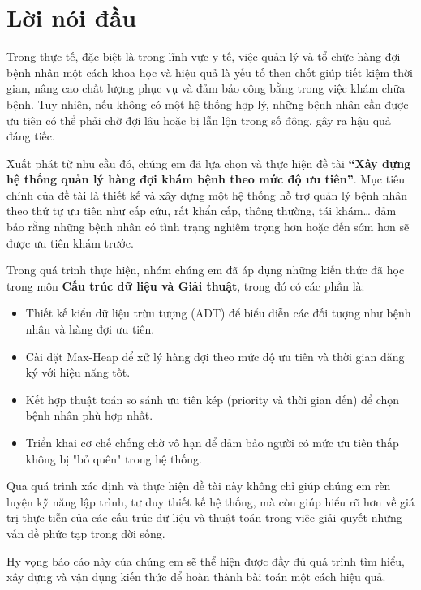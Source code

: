\section*{Lời nói đầu}
\thispagestyle{empty}
Trong thực tế, đặc biệt là trong lĩnh vực y tế, việc quản lý và tổ chức hàng đợi bệnh nhân một cách khoa học và hiệu quả là yếu tố then chốt giúp tiết kiệm thời gian, nâng cao chất lượng phục vụ và đảm bảo công bằng trong việc khám chữa bệnh. Tuy nhiên, nếu không có một hệ thống hợp lý, những bệnh nhân cần được ưu tiên có thể phải chờ đợi lâu hoặc bị lẫn lộn trong số đông, gây ra hậu quả đáng tiếc.

Xuất phát từ nhu cầu đó, chúng em đã lựa chọn và thực hiện đề tài \textbf{ “Xây dựng hệ thống quản lý hàng đợi khám bệnh theo mức độ ưu tiên”}. Mục tiêu chính của đề tài là thiết kế và xây dựng một hệ thống hỗ trợ quản lý bệnh nhân theo thứ tự ưu tiên như cấp cứu, rất khẩn cấp, thông thường, tái khám… đảm bảo rằng những bệnh nhân có tình trạng nghiêm trọng hơn hoặc đến sớm hơn sẽ được ưu tiên khám trước.

Trong quá trình thực hiện, nhóm chúng em đã áp dụng những kiến thức đã học trong môn \textbf{Cấu trúc dữ liệu và Giải thuật}, trong đó có các phần là:
\begin{itemize}
    \item Thiết kế kiểu dữ liệu trừu tượng (ADT) để biểu diễn các đối tượng như bệnh nhân và hàng đợi ưu tiên.
    \item Cài đặt Max-Heap để xử lý hàng đợi theo mức độ ưu tiên và thời gian đăng ký với hiệu năng tốt.
    \item Kết hợp thuật toán so sánh ưu tiên kép (priority và thời gian đến) để chọn bệnh nhân phù hợp nhất.
    \item Triển khai cơ chế chống chờ vô hạn để đảm bảo người có mức ưu tiên thấp không bị "bỏ quên" trong hệ thống.
\end{itemize}

Qua quá trình xác định và thực hiện đề tài này không chỉ giúp chúng em rèn luyện kỹ năng lập trình, tư duy thiết kế hệ thống, mà còn giúp hiểu rõ hơn về giá trị thực tiễn của các cấu trúc dữ liệu và thuật toán trong việc giải quyết những vấn đề phức tạp trong đời sống.

Hy vọng báo cáo này của chúng em sẽ thể hiện được đầy đủ quá trình tìm hiểu, xây dựng và vận dụng kiến thức để hoàn thành bài toán một cách hiệu quả.
\newpage